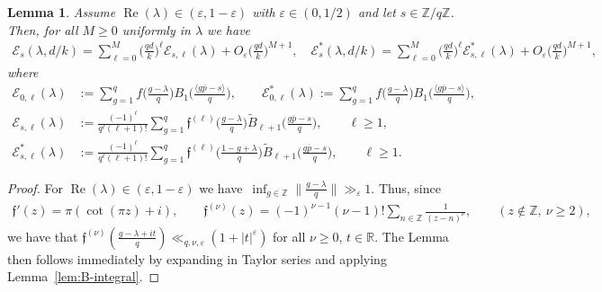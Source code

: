 \documentclass[11pt]{amsart}
\newcommand{\eps}{\varepsilon}
\newcommand{\ee}{\varepsilon}
\newcommand{\R}{\mathbb{R}}
\newcommand{\Z}{\mathbb{Z}}
\newcommand{\ang}[1]{\langle#1\rangle}
\newcommand{\lf}{{\mathfrak f}}
\newcommand{\Er}{{\mathcal E}}
\newtheorem{lemma}{Lemma}
\theoremstyle{definition}
\renewcommand\Re{\operatorname{Re}}
\newcommand{\1}{{\mathbf 1}}
\renewcommand{\bar}[1]{\overline{#1}}
\numberwithin{equation}{section}
\begin{document}
\begin{lemma}\label{expg0}
  Assume $\Re(\lambda)\in(\eps,1-\eps)$ with  $\eps\in(0,1/2)$ and let $s\in\Z/q\Z$.  Then, for all $M\geq0$ uniformly in $\lambda$ we have
  \begin{align} \label{gexp}
    \Er_s(\lambda,d/k)=\sum_{\ell=0}^M\Big(\frac {qd}k\Big)^\ell \Er_{s,\ell}(\lambda) +O_\eps\Big(\frac {qd}k\Big)^{M+1},\quad
    \Er_s^*(\lambda,d/k)=\sum_{\ell=0}^M\Big(\frac {qd}k\Big)^\ell \Er_{s,\ell}^*(\lambda) +O_\eps\Big(\frac {qd}k\Big)^{M+1},
  \end{align}
  where
  \begingroup
  \allowdisplaybreaks
  \begin{align*} 
    \Er_{0,\ell}(\lambda)&:=
    \sum_{g=1}^q f\Big(\frac{g-\lambda}q \Big)  B_{1}\Big( \frac{\ang{g\bar{p}-s} }q\Big),\qquad
    \Er^*_{0,\ell}(\lambda):=
    \sum_{g=1}^q f\Big(\frac{g-\lambda}q \Big)  B_{1}\Big( \frac{\ang{g\bar{p}-s} }q\Big),\\
    \Er_{s,\ell}(\lambda)&:=  \frac{(-1)^\ell}{q^\ell (\ell+1)!} \sum_{g=1}^q\lf^{(\ell)}\Big(\frac{g-\lambda}q \Big)   \tilde B_{\ell+1}\Big( \frac{g\bar{p}-s}q\Big),\qquad \ell\geq1,\\
    \Er^*_{s,\ell}(\lambda)&:=  \frac{(-1)^\ell}{q^\ell (\ell+1)!} \sum_{g=1}^q\lf^{(\ell)}\Big(\frac{1-g+\lambda}q \Big)   \tilde B_{\ell+1}\Big( \frac{g\bar{p}-s}q\Big),\qquad \ell\geq1.
  \end{align*}
  \endgroup
\end{lemma}
\begin{proof}
  For $\Re(\lambda)\in(\eps,1-\eps)$ we have~$\inf_{g\in\Z}\|\frac{g-\lambda}q\| \gg_\ee 1$. Thus, since
  \begin{align*}
    \lf'(z) = \pi (\cot(\pi z)+i),\qquad \lf^{(\nu)}(z) = (-1)^{\nu-1}(\nu-1)! \sum_{n\in\Z} \frac{1}{(z-n)^\nu},\qquad (z\notin\Z,\ \nu\geq2), 
  \end{align*}
  we have that $\lf^{(\nu)}(\frac{g-\lambda+it}q)\ll_{q,\nu,\eps} (1+|t|^\eps)$ for all $\nu\geq0$, $t\in\R$. The Lemma then follows immediately by expanding in Taylor series and applying Lemma~\ref{lem:B-integral}.
\end{proof}
\end{document}
